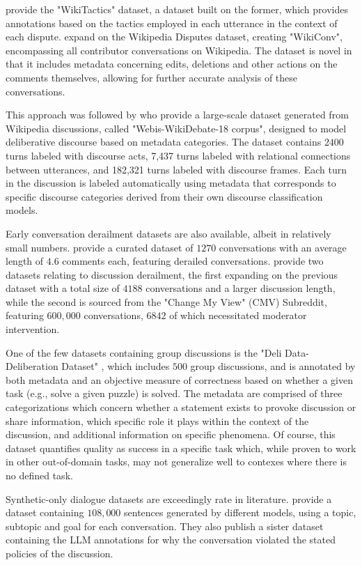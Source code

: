 \citet{dekock2022disagree} provide the "WikiTactics" dataset, a dataset built on the former, which provides annotations based on the tactics employed in each utterance in the context of each dispute. \citet{hua2018wikiconvcorpuscompleteconversational} expand on the Wikipedia Disputes dataset, creating "WikiConv", encompassing all contributor conversations on Wikipedia. The dataset is novel in that it includes metadata concerning edits, deletions and other actions on the comments themselves, allowing for further accurate analysis of these conversations. 

This approach was followed by \citet{al-khatib-etal-2018-modeling} who provide a large-scale dataset generated from Wikipedia discussions, called "Webis-WikiDebate-18 corpus", designed to model deliberative discourse based on metadata categories. The dataset contains $2400$ turns labeled with discourse acts, 7,437 turns labeled with relational connections between utterances, and 182,321 turns labeled with discourse frames. Each turn in the discussion is labeled automatically using metadata that corresponds to specific discourse categories derived from their own discourse classification models.

Early conversation derailment datasets are also available, albeit in relatively small numbers. \citet{zhang-2018-gone-awry} provide a curated dataset of $1270$ conversations with an average length of $4.6$ comments each, featuring derailed conversations. \citet{chang-danescu-niculescu-mizil-2019-trouble} provide two datasets relating to discussion derailment, the first expanding on the previous dataset with a total size of $4188$ conversations and a larger discussion length, while the second is sourced from the "Change My View" (CMV) Subreddit, featuring $600,000$ conversations, $6842$ of which necessitated moderator intervention.

One of the few datasets containing group discussions is the "Deli Data-Deliberation Dataset" \cite{karadzhov2023delidata}, which includes $500$ group discussions, and is annotated by both metadata and an objective measure of correctness based on whether a given task (e.g., solve a given puzzle) is solved. The metadata are comprised of three categorizations which concern whether a statement exists to provoke discussion or share information, which specific role it plays within the context of the discussion, and additional information on specific phenomena. Of course, this dataset quantifies quality as success in a specific task which, while proven to work in other out-of-domain tasks, may not generalize well to contexes where there is no defined task.

Synthetic-only dialogue datasets are exceedingly rate in literature. \cite{lambert2024selfdirectedsyntheticdialoguesrevisions} provide a dataset containing  $108,000$ sentences generated by different models, using a topic, subtopic and goal for each conversation. They also publish a sister dataset containing the LLM annotations for why the conversation violated the stated policies of the discussion.


